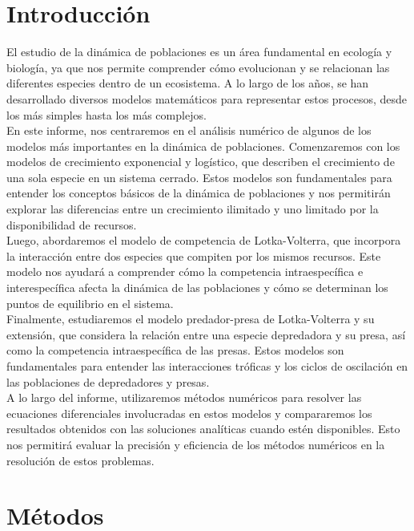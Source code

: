 \documentclass[12pt,a4]{article} %
\begin{document}
\begin{multicols}{2}
\raggedcolumns

\section{Introducción}
 El estudio de la dinámica de poblaciones es un área fundamental en ecología y biología, ya que nos permite comprender cómo evolucionan y se relacionan las diferentes especies dentro de un ecosistema. A lo largo de los años, se han desarrollado diversos modelos matemáticos para representar estos procesos, desde los más simples hasta los más complejos.\\
 
 En este informe, nos centraremos en el análisis numérico de algunos de los modelos más importantes en la dinámica de poblaciones. Comenzaremos con los modelos de crecimiento exponencial y logístico, que describen el crecimiento de una sola especie en un sistema cerrado. Estos modelos son fundamentales para entender los conceptos básicos de la dinámica de poblaciones y nos permitirán explorar las diferencias entre un crecimiento ilimitado y uno limitado por la disponibilidad de recursos.\\
 
 Luego, abordaremos el modelo de competencia de Lotka-Volterra, que incorpora la interacción entre dos especies que compiten por los mismos recursos. Este modelo nos ayudará a comprender cómo la competencia intraespecífica e interespecífica afecta la dinámica de las poblaciones y cómo se determinan los puntos de equilibrio en el sistema.\\
 
 Finalmente, estudiaremos el modelo predador-presa de Lotka-Volterra y su extensión, que considera la relación entre una especie depredadora y su presa, así como la competencia intraespecífica de las presas. Estos modelos son fundamentales para entender las interacciones tróficas y los ciclos de oscilación en las poblaciones de depredadores y presas.\\
 
 A lo largo del informe, utilizaremos métodos numéricos para resolver las ecuaciones diferenciales involucradas en estos modelos y compararemos los resultados obtenidos con las soluciones analíticas cuando estén disponibles. Esto nos permitirá evaluar la precisión y eficiencia de los métodos numéricos en la resolución de estos problemas.
\section{Métodos}


\end{multicols}
\end{document}
